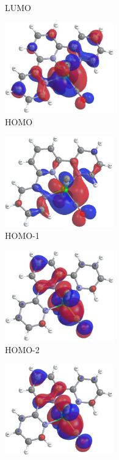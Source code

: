 \begin{figure}[!ht]
\begin{subfigure}[b]{0.31\textwidth}
  \caption{LUMO}
 \end{subfigure}
 \begin{subfigure}[b]{0.31\textwidth}
  \includegraphics[clip=true, width=\textwidth, height=39mm, keepaspectratio]{images/mos/6h.eps}
  \caption{HOMO}
 \end{subfigure}
 \begin{subfigure}[b]{0.31\textwidth}
  \includegraphics[clip=true, width=\textwidth, height=39mm, keepaspectratio]{images/mos/6h-1.eps}
  \caption{HOMO-1}
 \end{subfigure}
 \begin{subfigure}[b]{0.31\textwidth}
  \includegraphics[clip=true, width=\textwidth, height=39mm, keepaspectratio]{images/mos/6h-2.eps}
  \caption{HOMO-2}
 \end{subfigure}
 \begin{subfigure}[b]{0.31\textwidth}
  \includegraphics[clip=true, width=\textwidth, height=39mm, keepaspectratio]{images/mos/6h-3.eps}

\end{subfigure}
\end{figure}
